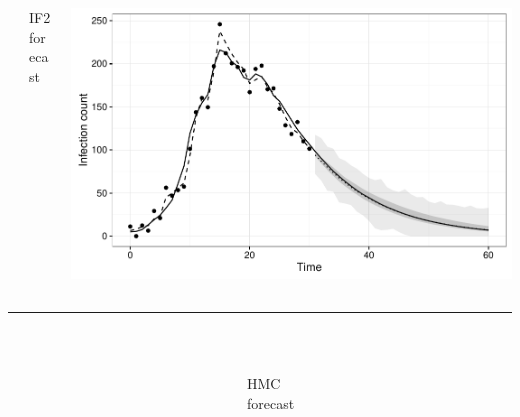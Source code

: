 \documentclass[12pt]{beamer}
\begin{document}
\begin{frame}

	\begin{columns}
		\begin{column}{0.00001\textwidth}
		\null
		\end{column}

		\begin{column}{0.25\textwidth}

			\null
			\large
			IF2 \\
			\vspace{0.5\baselineskip}
			\footnotesize
			forecast
			
		\end{column}
		\begin{column}{0.65\textwidth}

			\includegraphics[width=\textwidth,height=0.45\textheight,keepaspectratio=true]{../../writing/SC2/images/if2combined}

		\end{column}
	\end{columns}
	
	\textcolor{Grey50}{\rule{\textwidth}{0.4pt}} \\

	\begin{columns}
		\begin{column}{0.00001\textwidth}
		\null
		\end{column}

		\begin{column}{0.25\textwidth}

			\null
			\large
			HMC \\
			\vspace{0.5\baselineskip}
			\footnotesize
			forecast
			

\end{column}
\end{columns}
\end{frame}
\end{document}
